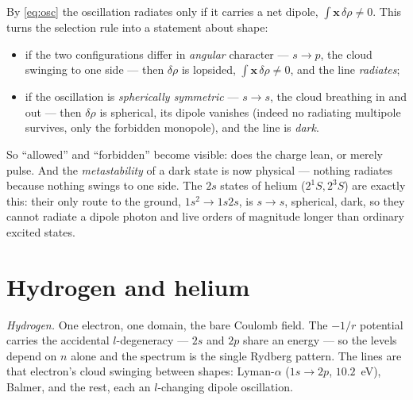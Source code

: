 \documentclass[11pt]{article}
\begin{document}
By \eqref{eq:osc} the oscillation radiates only if it carries a net dipole, $\int\mathbf x\,\delta\rho\neq0$.
This turns the selection rule into a statement about shape:
\begin{itemize}
\item if the two configurations differ in \emph{angular} character --- $s\to p$, the cloud swinging to one
side --- then $\delta\rho$ is lopsided, $\int\mathbf x\,\delta\rho\neq0$, and the line \emph{radiates};
\item if the oscillation is \emph{spherically symmetric} --- $s\to s$, the cloud breathing in and out ---
then $\delta\rho$ is spherical, its dipole vanishes (indeed no radiating multipole survives, only the
forbidden monopole), and the line is \emph{dark}.
\end{itemize}
So ``allowed'' and ``forbidden'' become visible: does the charge lean, or merely pulse. And the
\emph{metastability} of a dark state is now physical --- nothing radiates because nothing swings to one side.
The $2s$ states of helium ($2^1S,2^3S$) are exactly this: their only route to the ground, $1s^2\to1s2s$, is
$s\to s$, spherical, dark, so they cannot radiate a dipole photon and live orders of magnitude longer than
ordinary excited states.

\section{Hydrogen and helium}
\label{sec:HHe}

\emph{Hydrogen.} One electron, one domain, the bare Coulomb field. The $-1/r$ potential carries the
accidental $l$-degeneracy --- $2s$ and $2p$ share an energy --- so the levels depend on $n$ alone and the
spectrum is the single Rydberg pattern. The lines are that electron's cloud swinging between shapes:
Lyman-$\alpha$ ($1s\to2p$, $10.2$~eV), Balmer, and the rest, each an $l$-changing dipole oscillation.
\end{document}
